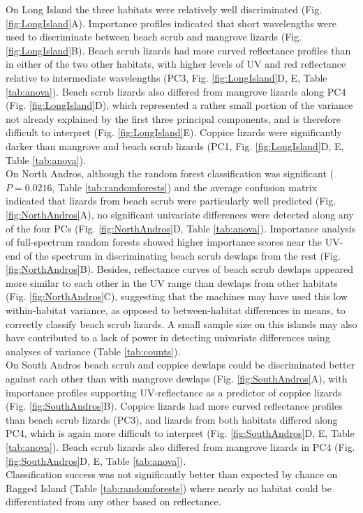 On Long Island the three habitats were relatively well discriminated (Fig. \ref{fig:LongIsland}A). Importance profiles indicated that short wavelengths were used to discriminate between beach scrub and mangrove lizards (Fig. \ref{fig:LongIsland}B). Beach scrub lizards had more curved reflectance profiles than in either of the two other habitats, with higher levels of UV and red reflectance relative to intermediate wavelengths (PC3, Fig. \ref{fig:LongIsland}D, E, Table \ref{tab:anova}). Beach scrub lizards also differed from mangrove lizards along PC4 (Fig. \ref{fig:LongIsland}D), which represented a rather small portion of the variance not already explained by the first three principal components, and is therefore difficult to interpret (Fig. \ref{fig:LongIsland}E). Coppice lizards were significantly darker than mangrove and beach scrub lizards (PC1, Fig. \ref{fig:LongIsland}D, E, Table \ref{tab:anova}).\\ 

On North Andros, although the random forest classification was significant ($P = 0.0216$, Table \ref{tab:randomforests}) and the average confusion matrix indicated that lizards from beach scrub were particularly well predicted (Fig. \ref{fig:NorthAndros}A), no significant univariate differences were detected along any of the four PCs (Fig. \ref{fig:NorthAndros}D, Table \ref{tab:anova}). Importance analysis of full-spectrum random forests showed higher importance scores near the UV-end of the spectrum in discriminating beach scrub dewlaps from the rest (Fig. \ref{fig:NorthAndros}B). Besides, reflectance curves of beach scrub dewlaps appeared more similar to each other in the UV range than dewlaps from other habitats (Fig. \ref{fig:NorthAndros}C), suggesting that the machines may have used this low within-habitat variance, as opposed to between-habitat differences in means, to correctly classify beach scrub lizards. A small sample size on this islands may also have contributed to a lack of power in detecting univariate differences using analyses of variance (Table \ref{tab:counts}).\\

On South Andros beach scrub and coppice dewlaps could be discriminated better against each other than with mangrove dewlaps (Fig. \ref{fig:SouthAndros}A), with importance profiles supporting UV-reflectance as a predictor of coppice lizards (Fig. \ref{fig:SouthAndros}B). Coppice lizards had more curved reflectance profiles than beach scrub lizards (PC3), and lizards from both habitats differed along PC4, which is again more difficult to interpret (Fig. \ref{fig:SouthAndros}D, E, Table \ref{tab:anova}). Beach scrub lizards also differed from mangrove lizards in PC4 (Fig. \ref{fig:SouthAndros}D, E, Table \ref{tab:anova}).\\

Classification success was not significantly better than expected by chance on Ragged Island (Table \ref{tab:randomforests}) where nearly no habitat could be differentiated from any other based on reflectance.
